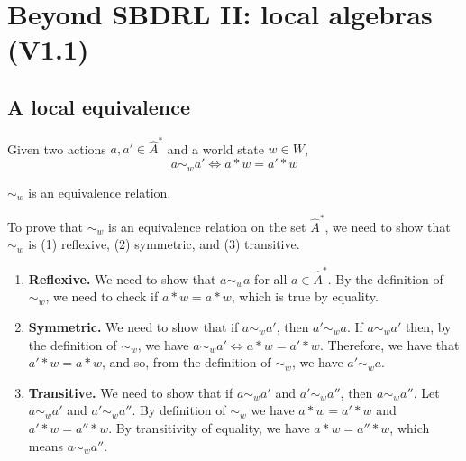 \chapter{
Beyond SBDRL II: local algebras
(V1.1)
}

\section{
A local equivalence
}

\begin{definition}
	Given two actions $a, a' \in \hat{A}^{*}$ and a world state $w \in W$,
	\begin{equation}
		a \sim_{w} a' \iff a \ast w = a' \ast w
	\end{equation}
\end{definition}

\begin{propositionE}
    $\sim_{w}$ is an equivalence relation.
\end{propositionE}
\begin{proofE}
    To prove that $\sim_{w}$ is an equivalence relation on the set $\hat{A}^{*}$, we need to show that $\sim_{w}$ is (1) reflexive, (2) symmetric, and (3) transitive.
    \begin{enumerate}[(1)]
        \item \textbf{Reflexive.}
        We need to show that $a \sim_{w} a$ for all $a \in \hat{A}^{*}$.
        By the definition of $\sim_{w}$, we need to check if $a \ast w = a \ast w$, which is true by equality.

        \item \textbf{Symmetric.}
        We need to show that if $a \sim_{w} a'$, then $a' \sim_{w} a$.
        If $a \sim_{w} a'$ then, by the definition of $\sim_{w}$, we have $a \sim_{w} a' \iff a \ast w = a' \ast w$.
        Therefore, we have that $a' \ast w = a \ast w$, and so, from the definition of $\sim_{w}$, we have $a' \sim_{w} a$.

        \item \textbf{Transitive.}
        We need to show that if $a \sim_{w} a'$ and $a' \sim_{w} a''$, then $a \sim_{w} a''$.
        Let $a \sim_{w} a'$ and $a' \sim_{w} a''$.
        By definition of $\sim_{w}$ we have $a \ast w = a' \ast w$ and $a' \ast w = a'' \ast w$.
        By transitivity of equality, we have $a \ast w = a'' \ast w$, which means $a \sim_{w} a''$.
    \end{enumerate}
\end{proofE}


